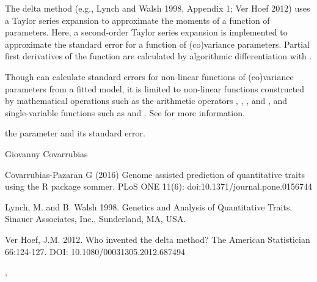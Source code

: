 \documentclass[a4paper]{book}
\begin{document}
%
\begin{Details}\relax

The delta method (e.g., Lynch and Walsh 1998, Appendix 1; Ver Hoef 2012) uses
a Taylor series expansion to approximate the moments of a function of
parameters. Here, a second-order Taylor series expansion is implemented to
approximate the standard error for a function of (co)variance parameters.
Partial first derivatives of the function are calculated by algorithmic
differentiation with .

Though  can calculate standard errors for non-linear functions
of (co)variance parameters from a fitted  model, it is limited
to non-linear functions constructed by mathematical operations such as the
arithmetic operators \code{+}, \code{-}, \code{*}, \code{/} and \code{\textasciicircum{}},
and single-variable functions such as   and . See 
 for more information.


\end{Details}
%
\begin{Value}

\begin{ldescription}
\item[\code{dd}] the parameter and its standard error.

\end{ldescription}
\end{Value}
%
\begin{Author}\relax
Giovanny Covarrubias
\end{Author}
%
\begin{References}\relax
Covarrubias-Pazaran G (2016) Genome assisted prediction of quantitative traits using the R package sommer. PLoS ONE 11(6): doi:10.1371/journal.pone.0156744 

Lynch, M. and B. Walsh 1998. Genetics and Analysis of Quantitative Traits. Sinauer Associates, Inc., Sunderland, MA, USA.

Ver Hoef, J.M. 2012. Who invented the delta method? The American Statistician 66:124-127. DOI: 10.1080/00031305.2012.687494


\end{References}
%
\begin{SeeAlso}\relax
{}, 
\end{SeeAlso}
%
\end{document}
